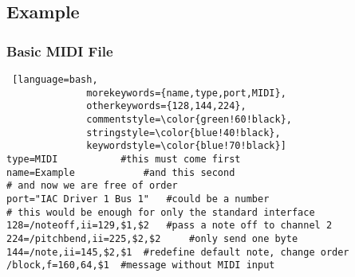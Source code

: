 \documentclass[12pt]{article}
\begin{document}
\clearpage

\subsection{Example}
\subsubsection{Basic MIDI File}
\begin{lstlisting} [language=bash,
			  morekeywords={name,type,port,MIDI},
			  otherkeywords={128,144,224},
			  commentstyle=\color{green!60!black},
			  stringstyle=\color{blue!40!black},
			  keywordstyle=\color{blue!70!black}]
type=MIDI 			#this must come first
name=Example			#and this second
# and now we are free of order
port="IAC Driver 1 Bus 1" 	#could be a number
# this would be enough for only the standard interface
128=/noteoff,ii=129,$1,$2 	#pass a note off to channel 2
224=/pitchbend,ii=225,$2,$2 	#only send one byte
144=/note,ii=145,$2,$1	#redefine default note, change order
/block,f=160,64,$1	#message without MIDI input
\end{lstlisting}

\vspace{3cm}
\end{document}

